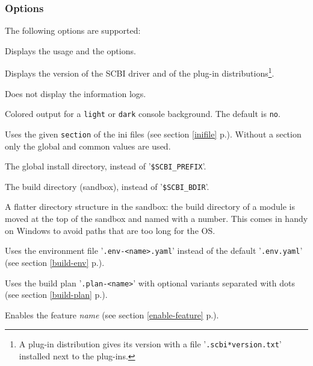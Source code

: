 \documentclass[a4paper,12pt,twoside]{article}
\newcommand{\code}[1]{\texttt{#1}}
\renewcommand{\emph}[1]{\textit{#1}}
\newcommand{\seeref}[1]{see section \ref{#1} p.\pageref{#1}}
\newcommand{\file}[1]{'{\texttt{#1}}'}
\newcommand{\ddash}{-{}-}
\begin{document}
\subsubsection{Options}
\label{options}

The following options are supported:

\begin{description}[font=\texttt]
	\item[-h | \ddash{}help] Displays the usage and the options.

	\item[-v | \ddash{}version] Displays the version of the SCBI driver and of the plug-in distributions\footnote{A plug-in distribution gives its version with a file \file{.scbi*version.txt} installed next to the plug-ins.}.

	\item[-q | \ddash{}quiet] Does not display the information logs.

	\item[\ddash{}color:{[}no|light|dark{]}] Colored output for a \code{light} or \code{dark} console background. The default is \code{no}.

	\item[\ddash{}ini{[}=<section>{]}] Uses the given \code{section} of the ini files (\seeref{inifile}). Without a section only the global and common values are used.

	\item[\ddash{}prefix=<dir>] The global install directory, instead of \file{\$SCBI\_PREFIX}.

	\item[\ddash{}build-dir=<dir>] The build directory (sandbox), instead of \file{\$SCBI\_BDIR}.

	\item[\ddash{}flat] A flatter directory structure in the sandbox: the build directory of a module is moved at the top of the sandbox and named with a number. This comes in handy on Windows to avoid paths that are too long for the OS.

	\item[-e | \ddash{}env=<name>] Uses the environment file \file{.env-<name>.yaml} instead of the default \file{.env.yaml} (\seeref{build-env}).

	\item[\ddash{}plan=<name>{[}/<variants>{]}] Uses the build plan \file{.plan-<name>} with optional variants separated with dots (\seeref{build-plan}).

	\item[\ddash{}enable-<name>] Enables the feature \emph{name} (\seeref{enable-feature}).


\end{description}
\end{document}
